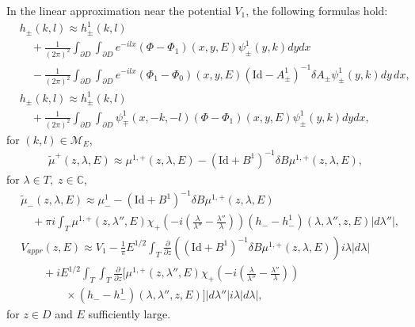 \documentclass[11pt,a4paper,english,subeqn]{amsart}
\theoremstyle{plain}
\theoremstyle{definition}
\numberwithin{equation}{section}
\begin{document}
In the linear approximation near the potential $V_1$, the following formulas hold:
\begin{subequations}
\begin{align}
&h_{\pm}(k,l) \approx h^1_{\pm}(k,l) \\ \nonumber 
&\quad + \frac{1}{(2 \pi)^2} \int_{\partial D} \int_{\partial D}e^{-ilx}(\Phi-\Phi_{1})(x,y,E)\psi^1_{\pm}(y,k)dy dx \\ \nonumber
&\quad -\frac{1}{(2 \pi)^2} \int_{\partial D} \int_{\partial D}e^{-ilx}(\Phi_1-\Phi_{0})(x,y,E)(\mathrm{Id}-A^1_{\pm})^{-1}\delta A_{\pm}\psi^1_{\pm}(y,k)dy\, dx,\\
&h_{\pm}(k,l) \approx h^1_{\pm}(k,l) \\ \nonumber 
&\quad + \frac{1}{(2 \pi)^2} \int_{\partial D} \int_{\partial D}\psi^1_{\mp}(x,-k,-l)(\Phi-\Phi_{1})(x,y,E)\psi^1_{\pm}(y,k)dy dx,
\end{align}
\end{subequations}
for $(k,l) \in {\mathscr{M}_E}$,
\begin{align}
\tilde \mu^+(z,\lambda,E) \approx \mu^{1,+}(z,\lambda,E) - (\mathrm{Id}+B^1)^{-1}\delta B \mu^{1,+}(z,\lambda,E),
\end{align}
for $\lambda \in T, \; z \in {\mathbb{C}}$,
\begin{align}
&\tilde \mu_{-} (z,\lambda, E) \approx \mu^1_{-}- (\mathrm{Id}+B^1)^{-1}\delta B \mu^{1,+}(z,\lambda,E) \\ \nonumber
&\quad +  \pi i \int_T \mu^{1,+}(z,\lambda'',E)  \chi_+ \left(- i \left(\frac{\lambda}{\lambda''} - \frac{\lambda''}{\lambda} \right) \right)(h_{-}-h^1_{-})(\lambda, \lambda'',z,E)  |d\lambda''|, \\
&V_{appr}(z,E) \approx V_1 - \frac 1 \pi E^{1/2} \int_T \frac{\partial}{\partial z}\left( (\mathrm{Id}+B^1)^{-1}\delta B \mu^{1,+}(z,\lambda,E) \right) i \lambda |d \lambda| \\ \nonumber
&\qquad + i E^{1/2} \int_T  \int_T  \frac{\partial}{\partial z}\Big[ \mu^{1,+}(z,\lambda'',E)  \chi_+ \left(- i \left(\frac{\lambda}{\lambda''} - \frac{\lambda''}{\lambda} \right) \right)  \\ \nonumber 
&\qquad \qquad \times (h_{-}-h^1_{-})(\lambda, \lambda'',z,E) \Big] |d\lambda''| i \lambda |d \lambda|,
\end{align}
for $z \in D$ and $E$ sufficiently large.
\end{document}
